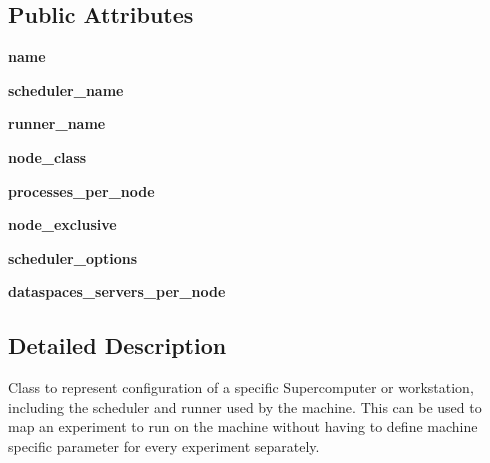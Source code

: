 \subsection*{Public Attributes}
\begin{DoxyCompactItemize}
\item 
\mbox{\label{classcodar_1_1savanna_1_1machines_1_1_machine_a7d2164c63e076a7240947b1a70e62f0f}} 
{\bfseries name}
\item 
\mbox{\label{classcodar_1_1savanna_1_1machines_1_1_machine_a179ace208a51d849459bf26fcf54acc4}} 
{\bfseries scheduler\+\_\+name}
\item 
\mbox{\label{classcodar_1_1savanna_1_1machines_1_1_machine_a65b17faeda10d83fdd8766430d62815f}} 
{\bfseries runner\+\_\+name}
\item 
\mbox{\label{classcodar_1_1savanna_1_1machines_1_1_machine_ad1f413ae8607221317675adb19a7887a}} 
{\bfseries node\+\_\+class}
\item 
\mbox{\label{classcodar_1_1savanna_1_1machines_1_1_machine_a4b4c0eda863f1003ae7d8bda02f2b96b}} 
{\bfseries processes\+\_\+per\+\_\+node}
\item 
\mbox{\label{classcodar_1_1savanna_1_1machines_1_1_machine_a516048c489dc334f0fe45d529e59c181}} 
{\bfseries node\+\_\+exclusive}
\item 
\mbox{\label{classcodar_1_1savanna_1_1machines_1_1_machine_aa26c50a13e89160894eff5a7fb180ed7}} 
{\bfseries scheduler\+\_\+options}
\item 
\mbox{\label{classcodar_1_1savanna_1_1machines_1_1_machine_a636168243907ca1035c8683a31a69c86}} 
{\bfseries dataspaces\+\_\+servers\+\_\+per\+\_\+node}
\end{DoxyCompactItemize}


\subsection{Detailed Description}
\begin{DoxyVerb}Class to represent configuration of a specific Supercomputer or
workstation, including the scheduler and runner used by the machine.
This can be used to map an experiment to run on the machine without
having to define machine specific parameter for every experiment
separately.\end{DoxyVerb}
 

